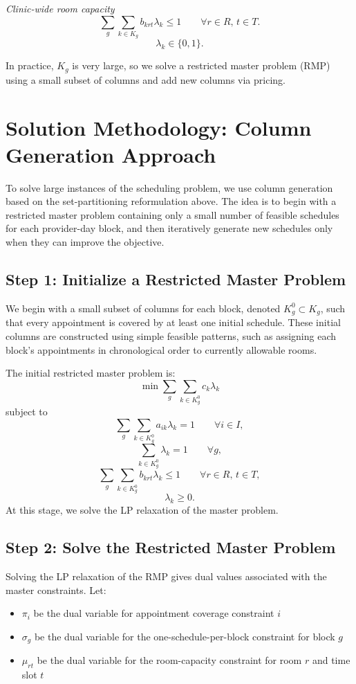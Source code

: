 \documentclass[12pt]{article}
\begin{document}
\noindent\textit{Clinic-wide room capacity}
\[
  \sum_{g} \sum_{k \in K_g} b_{krt} \lambda_k \le 1 \qquad \forall r \in R,\, t \in T.
\]
\[
  \lambda_k \in \{0, 1\}.
\]

In practice, $K_g$ is very large, so we solve a restricted master problem (RMP) using a small
subset of columns and add new columns via pricing.

\section{Solution Methodology: Column Generation Approach}

To solve large instances of the scheduling problem, we use column generation based on the
set-partitioning reformulation above. The idea is to begin with a restricted master problem
containing only a small number of feasible schedules for each provider-day block, and then
iteratively generate new schedules only when they can improve the objective.

\subsection*{Step 1: Initialize a Restricted Master Problem}

We begin with a small subset of columns for each block, denoted $K^0_g \subset K_g$, such
that every appointment is covered by at least one initial schedule. These initial columns are
constructed using simple feasible patterns, such as assigning each block's appointments in
chronological order to currently allowable rooms.

The initial restricted master problem is:
\[
  \min \sum_{g} \sum_{k \in K^0_g} c_k \lambda_k
\]
subject to
\[
  \sum_{g} \sum_{k \in K^0_g} a_{ik} \lambda_k = 1 \qquad \forall i \in I,
\]
\[
  \sum_{k \in K^0_g} \lambda_k = 1 \qquad \forall g,
\]
\[
  \sum_{g} \sum_{k \in K^0_g} b_{krt} \lambda_k \le 1 \qquad \forall r \in R,\, t \in T,
\]
\[
  \lambda_k \ge 0.
\]
At this stage, we solve the LP relaxation of the master problem.

\subsection*{Step 2: Solve the Restricted Master Problem}

Solving the LP relaxation of the RMP gives dual values associated with the master constraints. Let:
\begin{itemize}
  \item $\pi_i$ be the dual variable for appointment coverage constraint $i$
  \item $\sigma_g$ be the dual variable for the one-schedule-per-block constraint for block $g$
  \item $\mu_{rt}$ be the dual variable for the room-capacity constraint for room $r$ and time slot $t$
\end{itemize}
\end{document}

